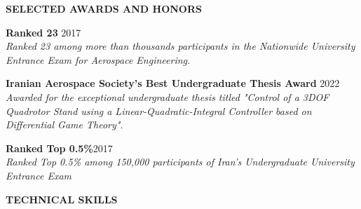 \documentclass[12pt]{article}
\begin{document}
\vspace{0.2in} %


\begin{center}
	{\noindent \bfseries SELECTED AWARDS AND HONORS}
\end{center}

 
\vspace{8pt} %


\noindent
{\bfseries Ranked 23} 
\hfill 2017 \vspace{4pt}\\
\textit{Ranked 23 among more than thousands participants in the Nationwide University Entrance Exam for Aerospace Engineering.}
\vspace{04pt}

\noindent
{\bfseries Iranian Aerospace Society's Best Undergraduate Thesis Award} 
\hfill 2022 \vspace{4pt} \\
\textit{Awarded for the exceptional
undergraduate thesis titled "Control of a 3DOF Quadrotor Stand using a Linear-Quadratic-Integral Controller 
based on Differential Game Theory".}

\vspace{02pt}
\noindent
{\bfseries Ranked Top 0.5\%}\hfill 2017 \vspace{4pt} \\ 
\textit{Ranked Top 0.5\% among 150,000 participants of Iran's Undergraduate University Entrance Exam}




\vspace{0.2in} %


\newpage
\begin{center}
	{\noindent \bfseries TECHNICAL SKILLS}
\end{center}

\end{document}
